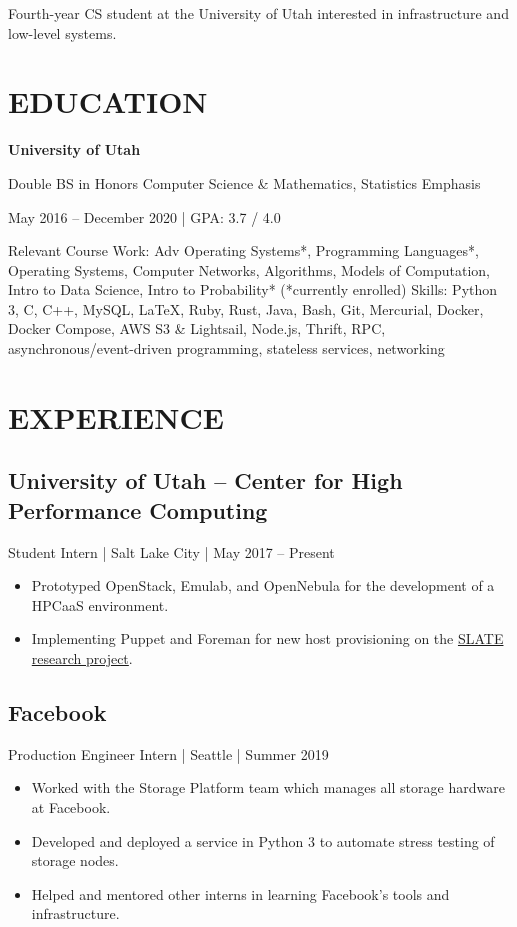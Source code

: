 \documentclass[10pt, letterpaper]{resume}
\begin{document}
\maketitle

{\centering
  Fourth-year CS student at the University of Utah interested in infrastructure and low-level systems.
  \par
}

\section{EDUCATION}
 {\centering
  \textbf{University of Utah}

  Double BS in Honors Computer Science \& Mathematics, Statistics Emphasis

  May 2016 -- December 2020 | GPA: 3.7 / 4.0
  \par
 }
\vspace{10pt}
{{\selectfont Relevant Course Work:}
  Adv Operating Systems*, Programming Languages*, Operating Systems, Computer Networks, Algorithms, Models of Computation, Intro to Data Science, Intro to Probability* {\footnotesize(*currently enrolled)}}
\smallbreak
{{\selectfont Skills:} Python 3, C, C++, MySQL, \LaTeX, Ruby, Rust, Java, Bash, Git, Mercurial, Docker, Docker Compose, AWS S3 \& Lightsail, Node.js, Thrift, RPC, asynchronous/event-driven programming, stateless services, networking}

\section{EXPERIENCE}
\subsection{University of Utah -- Center for High Performance Computing}
Student Intern | Salt Lake City | May 2017 -- Present
\begin{itemize}
  \item Prototyped OpenStack, Emulab, and OpenNebula for the development of a HPCaaS environment.
  \item Implementing Puppet and Foreman for new host provisioning on the \href{https://slateci.io}{SLATE research project}.
\end{itemize}

\subsection{Facebook}
Production Engineer Intern | Seattle | Summer 2019
\begin{itemize}
  \item Worked with the Storage Platform team which manages all storage hardware at Facebook.
  \item Developed and deployed a service in Python 3 to automate stress testing of storage nodes.
  \item Helped and mentored other interns in learning Facebook's tools and infrastructure.
\end{itemize}
\end{document}
